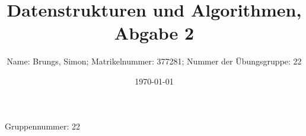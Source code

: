 \documentclass{article}
\title{Datenstrukturen und Algorithmen, Abgabe 2}
\author{Name: Brungs, Simon; Matrikelnummer: 377281; Nummer der Übungsgruppe: 22}
\date{\today}
\begin{document}
\noindent
Gruppennummer: 22%
\begingroup
\let\newpage\relax%
\maketitle
\endgroup
\renewcommand{\thesubsection}{\alph{subsection}}



\end{document}
